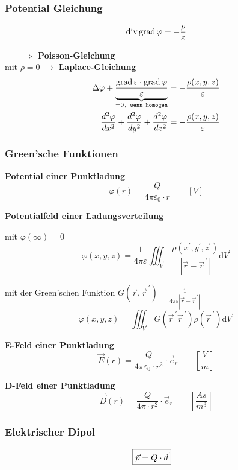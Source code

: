 \subsubsection{Potential Gleichung}
\[
    \operatorname{div} \operatorname{grad} \varphi = - \dfrac{\rho}{\varepsilon}
\]

\textbf{$\qquad \Rightarrow$ Poisson-Gleichung}\\
mit $\rho = 0$ $\rightarrow$ \textbf{Laplace-Gleichung}
\begin{align*}
    \Delta \varphi + \underbrace{ \dfrac{\operatorname{grad} \varepsilon \cdot \operatorname{grad} \varphi}{\varepsilon}}_{= 0\texttt{, wenn homogen}}
     & = - \dfrac{\rho (x, y, z)}{\varepsilon} \\
    \frac{d^2 \varphi}{d x^2} + \frac{d^2 \varphi}{d y^2} + \frac{d^2 \varphi}{d z^2}
     & = - \dfrac{\rho (x, y, z)}{\varepsilon}
\end{align*}

\subsubsection{Green'sche Funktionen}
\textbf{Potential einer Punktladung}
\[ \varphi (r) = \dfrac{Q}{4 \pi \varepsilon_0 \cdot r} \qquad\left[V\right]\] 

\textbf{Potentialfeld einer Ladungsverteilung}

mit $\varphi(\infty)=0$
\[
    \varphi(x, y, z)=\frac{1}{4 \pi \varepsilon} \iiint_{V^{\prime}}
    \frac{\rho\left(x^{\prime}, y^{\prime},
        z^{\prime}\right)}{\left|\vec{r}-\vec{r}^{\,\prime}\right|} \mathrm{d}
    V^{\prime}
\]

mit der Green'schen Funktion $G\left(\vec{r}, \vec{r}^{\,\prime}\right)=\frac{1}{4 \pi \varepsilon\left|\vec{r}-\vec{r}^{\,\prime}\right|}$
\[\varphi(x, y, z)=\iiint_{V^{\prime}} G\left(\vec{r}^{\,\prime} \vec{r}^{\,\prime}\right) \rho\left(\vec{r}^{\,\prime}\right) \mathrm{d} V^{\prime}\]


\textbf{E-Feld einer Punktladung}
\[ \vec{E}(r) = \dfrac{Q}{4 \pi \varepsilon_0 \cdot r^2}\cdot\vec{e}_r \qquad\left[\frac{V}{m}\right]\] 

\textbf{D-Feld einer Punktladung}
\[ \vec{D}(r) = \dfrac{Q}{4 \pi \cdot r^2}\cdot\vec{e}_r \qquad\left[\frac{As}{m^3}\right]\]

\subsubsection{Elektrischer Dipol}

\begin{align*}
    \Aboxed{\vec{p} = Q\cdot\vec{d}}
\end{align*}

